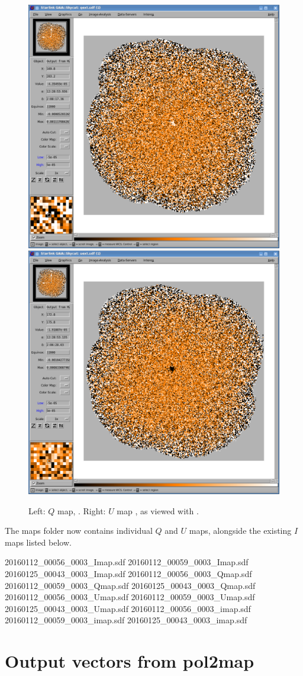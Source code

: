 \begin{figure}[t!]
\begin{center}
\includegraphics[width=0.46\linewidth]{sc22-gaia-view-qext.png}
\includegraphics[width=0.46\linewidth]{sc22-gaia-view-uext.png}
\label{fig:gaia-qext-uext}
\caption [Q and U maps in GAIA]{
  \small Left: $Q$ map, . Right: $U$ map , as viewed with \GAIA.
}
\end{center}
\end{figure}



The maps folder now contains individual $Q$ and $U$ maps, alongside the
existing $I$ maps listed below.

\begin{terminalv}
20160112_00056_0003_Imap.sdf  20160112_00059_0003_Imap.sdf  20160125_00043_0003_Imap.sdf
20160112_00056_0003_Qmap.sdf  20160112_00059_0003_Qmap.sdf  20160125_00043_0003_Qmap.sdf
20160112_00056_0003_Umap.sdf  20160112_00059_0003_Umap.sdf  20160125_00043_0003_Umap.sdf
20160112_00056_0003_imap.sdf  20160112_00059_0003_imap.sdf  20160125_00043_0003_imap.sdf
\end{terminalv}




\section{Output vectors from pol2map}


